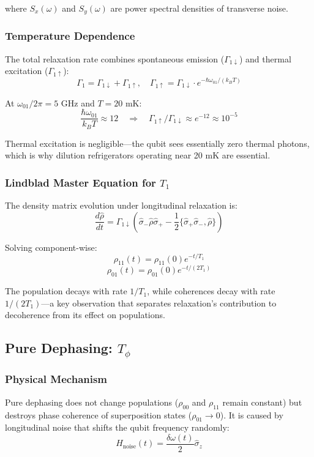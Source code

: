 \documentclass{article}
\begin{document}
where $S_x(\omega)$ and $S_y(\omega)$ are power spectral densities of transverse noise.

\subsubsection*{Temperature Dependence}

The total relaxation rate combines spontaneous emission ($\Gamma_{1\downarrow}$) and thermal excitation ($\Gamma_{1\uparrow}$):
$$\Gamma_1 = \Gamma_{1\downarrow} + \Gamma_{1\uparrow}, \quad \Gamma_{1\uparrow} = \Gamma_{1\downarrow} \cdot e^{-\hbar\omega_{01}/(k_B T)}$$

At $\omega_{01}/2\pi = 5$ GHz and $T = 20$ mK:
$$\frac{\hbar\omega_{01}}{k_B T} \approx 12 \quad \Rightarrow \quad \Gamma_{1\uparrow} / \Gamma_{1\downarrow} \approx e^{-12} \approx 10^{-5}$$

Thermal excitation is negligible—the qubit sees essentially zero thermal photons, which is why dilution refrigerators operating near 20 mK are essential.

\subsubsection*{Lindblad Master Equation for $T_1$}

The density matrix evolution under longitudinal relaxation is:
$$\frac{d\hat{\rho}}{dt} = \Gamma_{1\downarrow} \left(\hat{\sigma}_- \hat{\rho} \hat{\sigma}_+ - \frac{1}{2}\{\hat{\sigma}_+\hat{\sigma}_-, \hat{\rho}\}\right)$$

Solving component-wise:
$$\rho_{11}(t) = \rho_{11}(0) e^{-t/T_1}$$
$$\rho_{01}(t) = \rho_{01}(0) e^{-t/(2T_1)}$$

The population decays with rate $1/T_1$, while coherences decay with rate $1/(2T_1)$—a key observation that separates relaxation's contribution to decoherence from its effect on populations.

\subsection{Pure Dephasing: $T_\phi$}

\subsubsection*{Physical Mechanism}

Pure dephasing does not change populations ($\rho_{00}$ and $\rho_{11}$ remain constant) but destroys phase coherence of superposition states ($\rho_{01} \to 0$). It is caused by longitudinal noise that shifts the qubit frequency randomly:
$$H_{\text{noise}}(t) = \frac{\delta\omega(t)}{2}\hat{\sigma}_z$$
\end{document}

